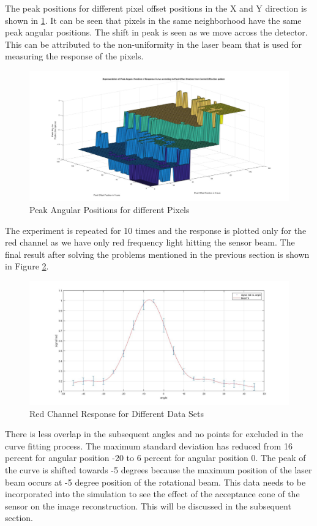The peak positions for different pixel offset positions in the X and Y direction is shown in \ref{fig:peak_pixel_pos}. It can be seen that pixels in the same neighborhood have the same peak angular positions. The shift in peak is seen as we move across the detector. This can be attributed to the non-uniformity in the laser beam that is used for measuring the response of the pixels.
\begin{figure}[!h]
\centering
\includegraphics[scale=0.225]{pics/MeshPlotAngularPeak.jpg}
\caption{Peak Angular Positions for different Pixels}
\label{fig:peak_pixel_pos}
\end{figure}

The experiment is repeated for 10 times and the response is plotted only for the red channel as we have only red frequency light hitting the sensor beam. The final result after solving the problems mentioned in the previous section is shown in Figure \ref{fig:acceptance_final}.
\begin{figure}[!h]
\centering
\includegraphics[scale=0.2125]{pics/FinalCRAExp.jpg}
\caption{Red Channel Response for Different Data Sets}
\label{fig:acceptance_final}
\end{figure}
There is less overlap in the subsequent angles and no points for excluded in the curve fitting process. The maximum standard deviation has reduced from 16 percent for angular position -20 to 6 percent for angular position 0. The peak of the curve is shifted towards -5 degrees because the maximum position of the laser beam occurs at -5 degree position of the rotational beam. This data needs to be incorporated into the simulation to see the effect of the acceptance cone of the sensor on the image reconstruction. This will be discussed in the subsequent section.
